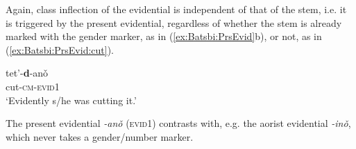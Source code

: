 \documentclass[output=paper]{langsci/langscibook}
\begin{document}
Again, class inflection of the evidential is independent of that of the stem, i.e. it 
is triggered by the present evidential, regardless of whether the stem is
already marked with the gender marker, as in
(\ref{ex:Batsbi:PrsEvid}b), or not, as in
(\ref{ex:Batsbi:PrsEvid:cut}).
    
\begin{exe}
  \ex \label{ex:Batsbi:PrsEvid:cut} \gll tet’-\textbf{d}-anǒ\\
  cut-\textsc{cm-evid1}\\
  \glt ‘Evidently s/he was cutting it.’ \hfill
  \citep[][181]{holisky:gagua:94}
\end{exe}

The present evidential \textit{-anǒ} (\textsc{evid1}) contrasts with,
e.g. the aorist evidential \textit{-inǒ}, which never
takes a gender/number marker. %





    
      


    
\end{document}

